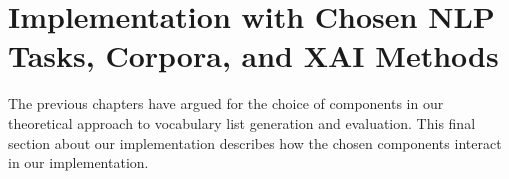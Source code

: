 %
%
\section{Implementation with Chosen NLP Tasks, Corpora, and XAI Methods} \label{sec:implementation-final}
The previous chapters have argued for the choice of components in our theoretical approach to vocabulary list generation and evaluation.
This final section about our implementation describes how the chosen components interact in our implementation.


